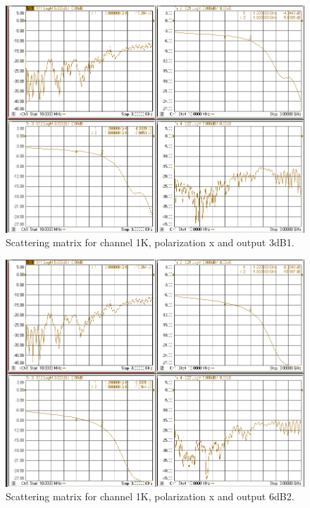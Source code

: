 \documentclass[12pt,a4paper,oneside]{article}
\begin{document}
\begin{figure}[H]
\centering
\includegraphics[width=0.9\linewidth]{VNA_results/1Kx_3dB1.png}
\caption{Scattering matrix for channel 1K, polarization x and output 3dB1.}
\label{fig:1Kx_3dB1}
\end{figure}


\begin{figure}[H]
\centering
\includegraphics[width=0.9\linewidth]{VNA_results/1Kx_6dB2.png}
\caption{Scattering matrix for channel 1K, polarization x and output 6dB2.}
\label{fig:1Kx_6dB2}
\end{figure}
\end{document}
